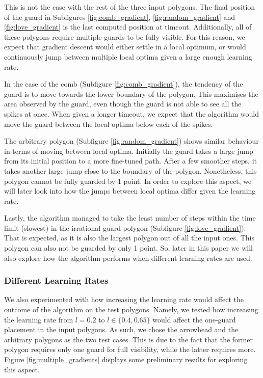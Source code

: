 This is not the case with the rest of the three input polygons. The final position of the guard in Subfigures \ref{fig:comb_gradient}, \ref{fig:random_gradient} and \ref{fig:love_gradient} is the last computed position at timeout. Additionally, all of these polygons require multiple guards to be fully visible. For this reason, we expect that gradient descent would either settle in a local optimum, or would continuously jump between multiple local optima given a large enough learning rate.

In the case of the comb (Subfigure \ref{fig:comb_gradient}), the tendency of the guard is to move towards the lower boundary of the polygon. This maximises the area observed by the guard, even though the guard is not able to see all the spikes at once. When given a longer timeout, we expect that the algorithm would move the guard between the local optima below each of the spikes.

The arbitrary polygon (Subfigure \ref{fig:random_gradient}) shows similar behaviour in terms of moving between local optima. Initially the guard takes a large jump from its initial position to a more fine-tuned path. After a few smoother steps, it takes another large jump close to the boundary of the polygon. Nonetheless, this polygon cannot be fully guarded by 1 point. In order to explore this aspect, we will later look into how the jumps between local optima differ given the learning rate.

Lastly, the algorithm managed to take the least number of steps within the time limit (slowest) in the irrational guard polygon (Subfigure \ref{fig:love_gradient}). That is expected, as it is also the largest polygon out of all the input ones. This polygon can also not be guarded by only 1 point. So, later in this paper we will also explore how the algorithm performs when different learning rates are used. 


\subsubsection{Different Learning Rates}
We also experimented with how increasing the learning rate would affect the outcome of the algorithm on the test polygons. Namely, we tested how increasing the learning rate from $l = 0.2$ to $l \in \{0.4, 0.65\}$ would affect the one-guard placement in the input polygons. As such, we chose the arrowhead and the arbitrary polygons as the two test cases. This is due to the fact that the former polygon requires only one guard for full visibility, while the latter requires more. Figure \ref{fig:multiple_gradients} displays some preliminary results for exploring this aspect. 

